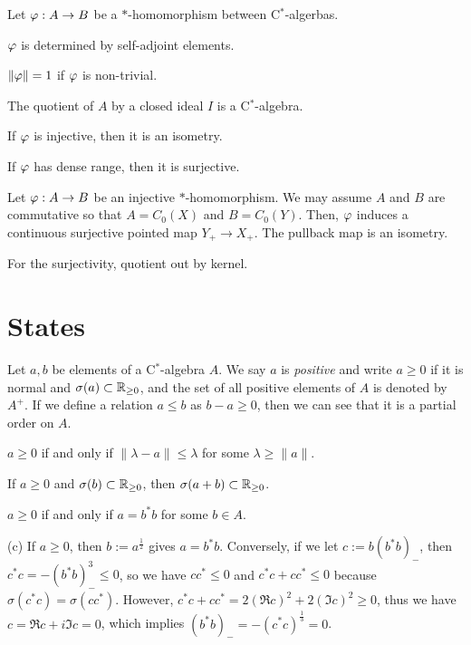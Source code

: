 \documentclass{../../large}
\begin{document}
\begin{prb}[$*$-homomorphisms]
Let $\varphi:A\to B$ be a $*$-homomorphism between C$^*$-algerbas.
\begin{parts}
\item $\varphi$ is determined by self-adjoint elements.
\item $\|\varphi\|=1$ if $\varphi$ is non-trivial.
\item The quotient of $A$ by a closed ideal $I$ is a C$^*$-algebra.
\item If $\varphi$ is injective, then it is an isometry.
\item If $\varphi$ has dense range, then it is surjective.
\end{parts}
\end{prb}
\begin{pf}

Let $\varphi:A\to B$ be an injective $*$-homomorphism.
We may assume $A$ and $B$ are commutative so that $A=C_0(X)$ and $B=C_0(Y)$.
Then, $\varphi$ induces a continuous surjective pointed map $Y_+\to X_+$.
The pullback map is an isometry.

For the surjectivity, quotient out by kernel.
\end{pf}





\section{States}


\begin{prb}
Let $a,b$ be elements of a C$^*$-algebra $A$.
We say $a$ is \emph{positive} and write $a\ge0$ if it is normal and $\sigma(a)\subset\mathbb{R}_{\ge0}$, and the set of all positive elements of $A$ is denoted by $A^+$.
If we define a relation $a\le b$ as $b-a\ge0$, then we can see that it is a partial order on $A$.
\begin{parts}
\item $a\ge0$ if and only if $\|\lambda-a\|\le\lambda$ for some $\lambda\ge\|a\|$.
\item If $a\ge0$ and $\sigma(b)\subset\mathbb{R}_{\ge0}$, then $\sigma(a+b)\subset\mathbb{R}_{\ge0}$.
\item $a\ge0$ if and only if $a=b^*b$ for some $b\in A$.
\end{parts}
\end{prb}
\begin{pf}
(c)
If $a\ge0$, then $b:=a^{\frac12}$ gives $a=b^*b$.
Conversely, if we let $c:=b(b^*b)_-$, then $c^*c=-(b^*b)_-^3\le0$, so we have $cc^*\le0$ and $c^*c+cc^*\le0$ because $\sigma(c^*c)=\sigma(cc^*)$.
However, $c^*c+cc^*=2(\Re c)^2+2(\Im c)^2\ge0$, thus we have $c=\Re c+i\Im c=0$, which implies $(b^*b)_-=-(c^*c)^{\frac13}=0$.
\end{pf}
\end{document}
